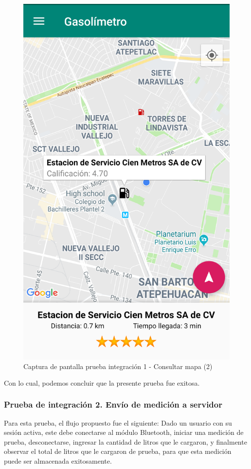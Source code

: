 \begin{figure}[H]
	\centering
	\includegraphics[scale=.2]{DocumentoTecnico/Capitulo6/integracion/Software/images/4.png}
	\caption{Captura de pantalla prueba integración 1 - Consultar mapa (2)}
	\label{fig:int4}
\end{figure}

Con lo cual, podemos concluir que la presente prueba fue exitosa.


\subsubsection{Prueba de integración 2. Envío de medición a servidor}
Para esta prueba, el flujo propuesto fue el siguiente: Dado un usuario con su sesión activa, este debe conectarse al módulo Bluetooth, iniciar una medición de prueba, desconectarse, ingresar la cantidad de litros que le cargaron, y finalmente observar el total de litros que le cargaron de prueba, para que esta medición puede ser almacenada exitosamente.\\

